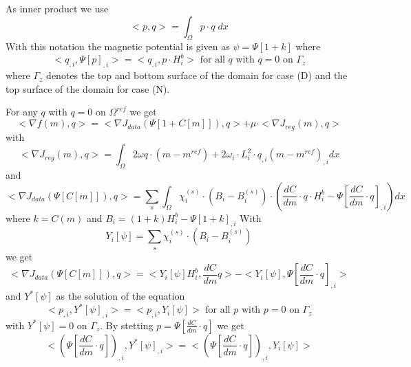 As inner product we use 
\begin{equation}\label{MAG:EQU:200}
<p,q> = \int_{\Omega} p \cdot q \; dx
\end{equation} 
With this notation the magnetic potential is given as $\psi=\Psi[1+k]$ where
\begin{equation}\label{MAG:EQU:201}
< q_{,i},\Psi[p]_{,i} > = < q_{,i} , p \cdot H^b_i> \mbox{ for all } q \mbox{ with } q=0 \mbox{ on } \Gamma_{z}
\end{equation} 
where $\Gamma_{z}$ denotes the top and bottom surface of the domain for case (D)
and the top surface of the domain for case (N). 



For any $q$ with $q=0$ on $\Omega^{ref}$ we get 
\begin{equation}\label{MAG:EQU:202}
< \nabla f(m),q> = < \nabla J_{data}(\Psi[1+C[m]]), q>  +  \mu \cdot < \nabla J_{reg}(m),q>
\end{equation} 
with 
\begin{equation}\label{MAG:EQU:202a}
< \nabla J_{reg}(m),q> = 
\int_{\Omega} 2 \omega q \cdot (m-m^{ref}) + 2 \omega_i \cdot L_i^2 \cdot q_{,i} (m-m^{ref})_{,i} dx
\end{equation} 
and 
\begin{equation}\label{MAG:EQU:202b}
< \nabla J_{data}(\Psi[C[m]]), q> =  \sum_{s} \int_{\Omega} \chi^{(s)}_i \cdot (  B_i  -  B^{(s)}_i ) 
\cdot ( \frac{dC}{dm} \cdot q \cdot H^b_i  - \Psi[\frac{dC}{dm} \cdot q]_{,i}) dx 
\end{equation} 
where $k=C(m)$ and $B_i=(1+k) H^b_i  - \Psi[1+k]_{,i}$
With
\begin{equation}\label{MAG:EQU:202c}
Y_i[\psi]= \sum_{s} \chi^{(s)}_i \cdot (  B_i  -  B^{(s)}_i ) 
\end{equation} 
we get 
\begin{equation}\label{MAG:EQU:202bb}
< \nabla J_{data}(\Psi[C[m]]), q> = 
< Y_i[\psi] H^b_i, \frac{dC}{dm} q> - < Y_i[\psi] ,  \Psi[\frac{dC}{dm} \cdot q]_{,i} >
\end{equation} 
and $Y^*[\psi]$ as the solution of the equation 
\begin{equation}\label{MAG:EQU:202d}
< p_{,i},Y^*[\psi]_{,i} > =  < p_{,i} ,Y_i[\psi] > \mbox{ for all } p \mbox{ with } p=0 \mbox{ on } \Gamma_{z}
\end{equation} 
with $Y^*[\psi]=0$ on $\Gamma_{z}$. 
By stetting $p=\Psi[\frac{dC}{dm} \cdot q]$ we get
\begin{equation}\label{MAG:EQU:202e}
<(\Psi[\frac{dC}{dm} \cdot q]) _{,i},Y^*[\psi]_{,i} > =  < (\Psi[\frac{dC}{dm} \cdot q])_{,i} ,Y_i[\psi] >
\end{equation} 
